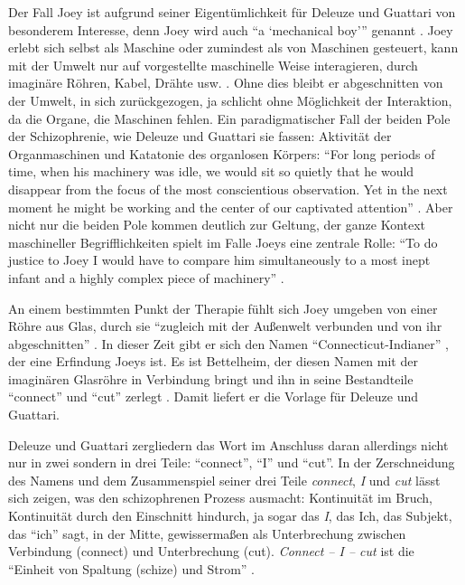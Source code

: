 \documentclass[12pt,
               paper=a4,
               twoside=false,
               onehalfspacing,
               bibliography=totoc,
               toc=graduated,
               ]{scrartcl}
\newcommand{\pc}[2]{\parencite[#1]{#2}}
\newcommand{\vgl}[2]{\parencite[vgl.][#1]{#2}}
\newcommand{\cic}{Connect -- I -- cut\xspace}
\newcommand{\dg}{Deleuze und Guattari\xspace}
\begin{document}
Der Fall Joey ist aufgrund seiner Eigentümlichkeit für \dg von
besonderem Interesse, denn Joey wird auch \enquote{a
\enquote{mechanical boy}} genannt \pc{3}{joey}. Joey erlebt sich
selbst als Maschine oder zumindest als von Maschinen gesteuert, kann
mit der Umwelt nur auf vorgestellte maschinelle Weise interagieren,
durch imaginäre Röhren, Kabel, Drähte usw. \vgl{3}{joey}. Ohne dies
bleibt er abgeschnitten von der Umwelt, in sich zurückgezogen, ja
schlicht ohne Möglichkeit der Interaktion, da die  Organe, die
Maschinen fehlen. Ein paradigmatischer Fall der beiden Pole der
Schizophrenie, wie \dg sie fassen: Aktivität der Organmaschinen und
Katatonie des organlosen Körpers: "`For long periods of time, when his
\glq machinery\grq{} was idle, we would sit so quietly that he would
disappear from the focus of the most conscientious observation. Yet in
the next moment he might be \glq working\grq{} and the center of our
captivated attention"' \pc{3}{joey}. Aber nicht nur die beiden Pole
kommen deutlich zur Geltung, der ganze Kontext maschineller
Begrifflichkeiten spielt im Falle Joeys eine zentrale Rolle: "`To do
justice to Joey I would have to compare him simultaneously to a most
inept infant and a highly complex piece of machinery"' \pc{3}{joey}.

An einem bestimmten Punkt der Therapie \vgl{398-404}{emptyf} fühlt
sich Joey umgeben von einer Röhre aus Glas, durch sie "`zugleich mit
der Außenwelt verbunden und von ihr abgeschnitten"' \pc{399}{emptyf}.
In dieser Zeit gibt er sich den Namen "`Connecticut-Indianer"'
\pc{399}{emptyf}, der eine Erfindung Joeys ist. Es ist Bettelheim, der
diesen Namen mit der imaginären Glasröhre in Verbindung bringt und ihn
in seine Bestandteile "`connect"' und "`cut"' zerlegt
\vgl{399}{emptyf}. Damit liefert er die Vorlage für \dg.

\dg zergliedern das Wort im Anschluss daran allerdings nicht nur in
zwei sondern in drei Teile: \enquote{connect}, \enquote{I} und
\enquote{cut}.
In der Zerschneidung des Namens und dem Zusammenspiel seiner drei
Teile \emph{connect}, \emph{I} und \emph{cut} lässt sich zeigen, was
den schizophrenen Prozess ausmacht: Kontinuität im Bruch, Kontinuität
durch den Einschnitt hindurch, ja sogar das \emph{I}, das Ich, das
Subjekt, das "`ich"' sagt, in der Mitte, gewissermaßen als
Unterbrechung zwischen Verbindung (connect) und Unterbrechung (cut).
\emph{\cic} ist die "`Einheit von Spaltung (schize) und Strom"'
\pc{296}{ao}.
\end{document}
